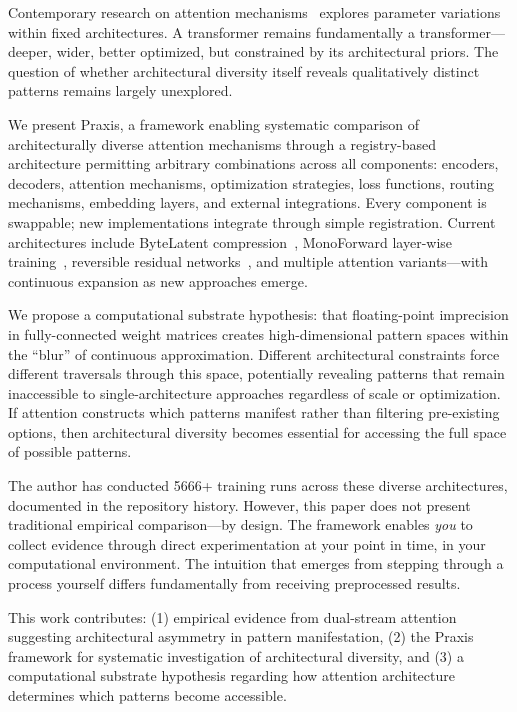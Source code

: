 \documentclass{article}
\begin{document}
Contemporary research on attention mechanisms~\cite{vaswani2017attention} explores parameter variations within fixed architectures. A transformer remains fundamentally a transformer—deeper, wider, better optimized, but constrained by its architectural priors. The question of whether architectural diversity itself reveals qualitatively distinct patterns remains largely unexplored.

We present Praxis, a framework enabling systematic comparison of architecturally diverse attention mechanisms through a registry-based architecture permitting arbitrary combinations across all components: encoders, decoders, attention mechanisms, optimization strategies, loss functions, routing mechanisms, embedding layers, and external integrations. Every component is swappable; new implementations integrate through simple registration. Current architectures include ByteLatent compression~\cite{pagnoni2024byte}, MonoForward layer-wise training~\cite{monoforward2025}, reversible residual networks~\cite{gomez2017reversible}, and multiple attention variants—with continuous expansion as new approaches emerge.

We propose a computational substrate hypothesis: that floating-point imprecision in fully-connected weight matrices creates high-dimensional pattern spaces within the ``blur'' of continuous approximation. Different architectural constraints force different traversals through this space, potentially revealing patterns that remain inaccessible to single-architecture approaches regardless of scale or optimization. If attention constructs which patterns manifest rather than filtering pre-existing options, then architectural diversity becomes essential for accessing the full space of possible patterns.

The author has conducted 5666+ training runs across these diverse architectures, documented in the repository history. However, this paper does not present traditional empirical comparison—by design. The framework enables \textit{you} to collect evidence through direct experimentation at your point in time, in your computational environment. The intuition that emerges from stepping through a process yourself differs fundamentally from receiving preprocessed results.

This work contributes: (1) empirical evidence from dual-stream attention suggesting architectural asymmetry in pattern manifestation, (2) the Praxis framework for systematic investigation of architectural diversity, and (3) a computational substrate hypothesis regarding how attention architecture determines which patterns become accessible.
\end{document}
